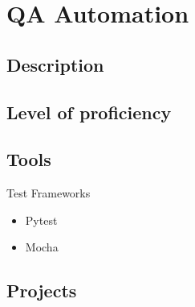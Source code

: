 \section{QA Automation}

\subsection{Description}
\subsection{Level of proficiency}
\subsection{Tools}

\item Test Frameworks
\begin{itemize}
    \item Pytest
    \item Mocha
\end{itemize}

\subsection{Projects}

\newpage
